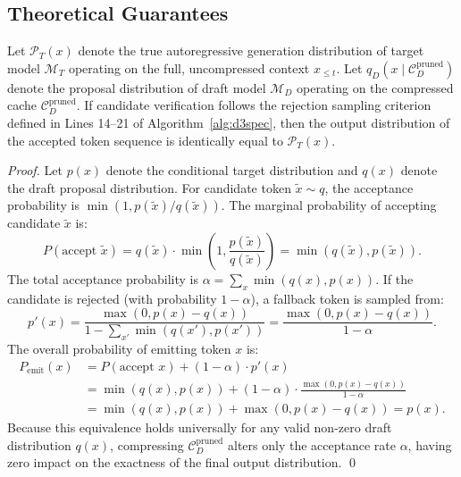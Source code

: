 \documentclass[runningheads]{llncs}
\begin{document}
\subsection{Theoretical Guarantees}
\begin{theorem}
Let $\mathcal{P}_T(x)$ denote the true autoregressive generation distribution of target model $\mathcal{M}_T$ operating on the full, uncompressed context $x_{\le t}$. Let $q_D(x \mid \mathcal{C}_D^{\text{pruned}})$ denote the proposal distribution of draft model $\mathcal{M}_D$ operating on the compressed cache $\mathcal{C}_D^{\text{pruned}}$. If candidate verification follows the rejection sampling criterion defined in Lines 14--21 of Algorithm~\ref{alg:d3spec}, then the output distribution of the accepted token sequence is identically equal to $\mathcal{P}_T(x)$.
\end{theorem}

\begin{proof}
Let $p(x)$ denote the conditional target distribution and $q(x)$ denote the draft proposal distribution. For candidate token $\tilde{x} \sim q$, the acceptance probability is $\min(1, p(\tilde{x})/q(\tilde{x}))$. The marginal probability of accepting candidate $\tilde{x}$ is:
\begin{equation}
    P(\text{accept } \tilde{x}) = q(\tilde{x}) \cdot \min\left(1, \frac{p(\tilde{x})}{q(\tilde{x})}\right) = \min(q(\tilde{x}), p(\tilde{x})).
\end{equation}
The total acceptance probability is $\alpha = \sum_x \min(q(x), p(x))$. If the candidate is rejected (with probability $1 - \alpha$), a fallback token is sampled from:
\begin{equation}
    p'(x) = \frac{\max(0, p(x) - q(x))}{1 - \sum_{x'} \min(q(x'), p(x'))} = \frac{\max(0, p(x) - q(x))}{1 - \alpha}.
\end{equation}
The overall probability of emitting token $x$ is:
\begin{align}
    P_{\text{emit}}(x) &= P(\text{accept } x) + (1 - \alpha) \cdot p'(x) \nonumber \\
    &= \min(q(x), p(x)) + (1 - \alpha) \cdot \frac{\max(0, p(x) - q(x))}{1 - \alpha} \nonumber \\
    &= \min(q(x), p(x)) + \max(0, p(x) - q(x)) = p(x).
\end{align}
Because this equivalence holds universally for any valid non-zero draft distribution $q(x)$, compressing $\mathcal{C}_D^{\text{pruned}}$ alters only the acceptance rate $\alpha$, having zero impact on the exactness of the final output distribution. \qed
\end{proof}
\end{document}
